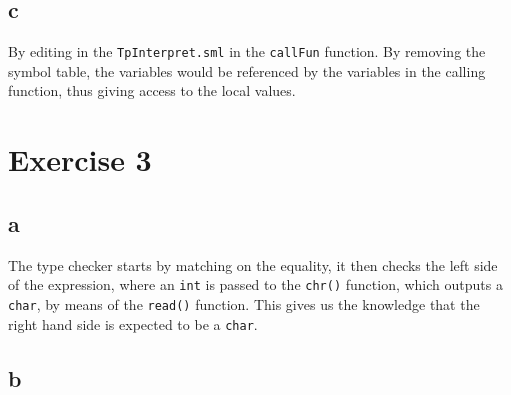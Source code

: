 \documentclass{article}
\begin{document}
\subsection{c}
By editing in the \texttt{TpInterpret.sml} in the \texttt{callFun} function. By removing the symbol table, the variables would be referenced by the variables in the calling function, thus giving access to the local values.  

\section{Exercise 3}
\subsection{a}
The type checker starts by matching on the equality, it then checks the left side of the expression, where an \texttt{int} is passed to the \texttt{chr()} function, which outputs a \texttt{char}, by means of the \texttt{read()} function. This gives us the knowledge that the right hand side is expected to be a \texttt{char}. 
\subsection{b}
\end{document}
